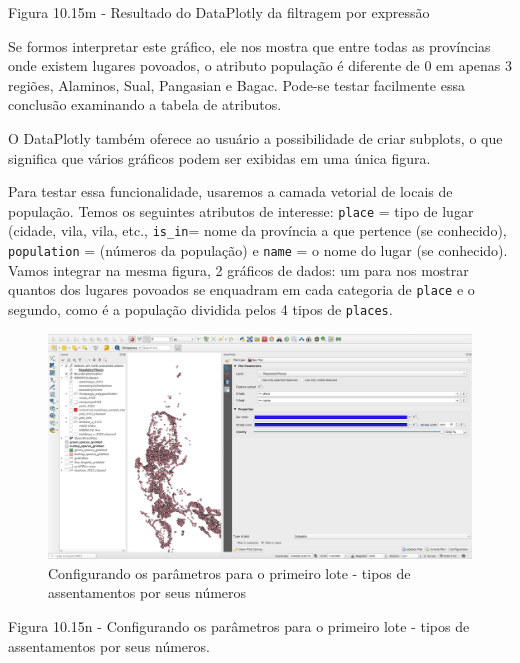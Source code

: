 \documentclass[
]{krantz}
\begin{document}
Figura 10.15m - Resultado do DataPlotly da filtragem por expressão

Se formos interpretar este gráfico, ele nos mostra que entre todas as províncias onde existem lugares povoados, o atributo população é diferente de 0 em apenas 3 regiões, Alaminos, Sual, Pangasian e Bagac. Pode-se testar facilmente essa conclusão examinando a tabela de atributos.

O DataPlotly também oferece ao usuário a possibilidade de criar subplots, o que significa que vários gráficos podem ser exibidas em uma única figura.

Para testar essa funcionalidade, usaremos a camada vetorial de locais de população. Temos os seguintes atributos de interesse: \texttt{place} = tipo de lugar (cidade, vila, vila, etc., \texttt{is\_in}= nome da província a que pertence (se conhecido), \texttt{population} = (números da população) e \texttt{name} = o nome do lugar (se conhecido). Vamos integrar na mesma figura, 2 gráficos de dados: um para nos mostrar quantos dos lugares povoados se enquadram em cada categoria de \texttt{place} e o segundo, como é a população dividida pelos 4 tipos de \texttt{places}.

\begin{figure}
\centering
\includegraphics{media/modulo10/fig1015_n.png}
\caption{Configurando os parâmetros para o primeiro lote - tipos de assentamentos por seus números}
\end{figure}

Figura 10.15n - Configurando os parâmetros para o primeiro lote - tipos de assentamentos por seus números.
\end{document}
